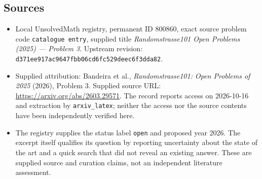 \documentclass[11pt]{article}
\begin{document}
\subsection{Sources}
\begin{itemize}
\item Local UnsolvedMath registry, permanent ID \(800860\), exact source problem code \texttt{catalogue entry}, supplied title \emph{Randomstrasse101 Open Problems (2025) --- Problem 3}. Upstream revision: \texttt{d371ee917ac9647fbb06cd6fc529deec6f3dda82}.
\item Supplied attribution: Bandeira et al., \emph{Randomstrasse101: Open Problems of 2025} (2026), Problem 3. Supplied source URL: \url{https://arxiv.org/abs/2603.29571}. The record reports access on 2026-10-16 and extraction by \texttt{arxiv\_latex}; neither the access nor the source contents have been independently verified here.
\item The registry supplies the status label \texttt{open} and proposed year 2026. The excerpt itself qualifies its question by reporting uncertainty about the state of the art and a quick search that did not reveal an existing answer. These are supplied source and curation claims, not an independent literature assessment.
\end{itemize}
\end{document}
